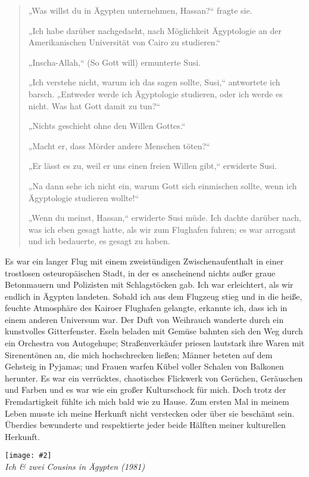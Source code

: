 \documentclass[12pt]{memoir}
\newcommand{\img}[3]{\begin{center}%
\texttt{[image: \#2]}\\{\small\em#3}%
\end{center}}
\begin{document}
\begin{quote}
„Was willst du in Ägypten unternehmen, Hassan?“ fragte sie.

„Ich habe darüber nachgedacht, nach Möglichkeit Ägyptologie
an der Amerikanischen Universität von Cairo zu studieren.“

„Inscha-Allah,“ (So Gott will) ermunterte Susi.

„Ich verstehe nicht, warum ich das sagen sollte, Susi,“ antwortete ich barsch.
„Entweder werde ich Ägyptologie studieren, oder ich werde es nicht.
Was hat Gott damit zu tun?“

„Nichts geschieht ohne den Willen Gottes.“

„Macht er, dass Mörder andere Menschen töten?“

„Er lässt es zu, weil er uns einen freien Willen gibt,“ erwiderte Susi.

„Na dann sehe ich nicht ein, warum Gott sich einmischen sollte,
wenn ich Ägyptologie studieren wollte!“

„Wenn du meinst, Hassan,“ erwiderte Susi müde.
Ich dachte darüber nach, was ich eben gesagt hatte,
als wir zum Flughafen fuhren;
es war arrogant und ich bedauerte, es gesagt zu haben.
\end{quote}

Es war ein langer Flug mit einem zweistündigen Zwischenaufenthalt
in einer trostlosen osteuropäischen Stadt,
in der es anscheinend nichts außer graue Betonmauern
und Polizisten mit Schlagstöcken gab.
Ich war erleichtert, als wir endlich in Ägypten landeten.
Sobald ich aus dem Flugzeug stieg und in die heiße,
feuchte Atmosphäre des Kairoer Flughafen gelangte, erkannte ich,
dass ich in einem anderen Universum war.
Der Duft von Weihrauch wanderte durch ein kunstvolles Gitterfenster.
Eseln beladen mit Gemüse bahnten sich den Weg
durch ein Orchestra von Autogehupe;
Straßenverkäufer priesen lautstark ihre Waren mit Sirenentönen an,
die mich hochschrecken ließen;
Männer beteten auf dem Gehsteig in Pyjamas;
und Frauen warfen Kübel voller Schalen von Balkonen herunter.
Es war ein verrücktes, chaotisches Flickwerk von Gerüchen,
Geräuschen und Farben und es war wie ein großer Kulturschock für mich.
Doch trotz der Fremdartigkeit fühlte ich mich bald wie zu Hause.
Zum ersten Mal in meinem Leben musste ich meine Herkunft nicht verstecken
oder über sie beschämt sein.
Überdies bewunderte und respektierte jeder beide Hälften
meiner kulturellen Herkunft.

\img{scale=0.3}{Hassan_Cousins.jpg}
{Ich \& zwei Cousins in Ägypten (1981)}
\end{document}

